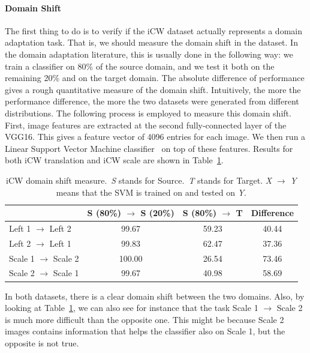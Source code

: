 \documentclass[../main.tex]{subfiles}
\begin{document}
    \paragraph{Domain Shift}
    The first thing to do is to verify if the iCW dataset actually represents a domain adaptation task. That is,
    we should measure the domain shift in the dataset. In the domain adaptation literature, this is usually
    done in the following way: we train a classifier on 80\% of the source domain, and we test it both on the
    remaining 20\% and on the target domain. The absolute difference of performance gives a
    rough quantitative measure of the domain shift. Intuitively, the more the performance difference,
    the more the two datasets were generated from different distributions. The following process is employed
    to measure this domain shift. First, image features are extracted at the second fully-connected layer of the
    VGG16. This gives a feature vector of 4096 entries for each image. We then run a Linear Support Vector Machine
    classifier~\cite{fan2008liblinear} on top of these features. Results for both iCW translation and iCW scale
	are shown in Table~\ref{table:domain-shift}.

	\begin{table}[!ht]
		\centering{}
		\begin{tabular}{l c c c}
			\toprule
                     & S (80\%) $\rightarrow$ S (20\%)  & S (80\%) $\rightarrow$ T & Difference \\
			\midrule
			Left 1 $\rightarrow$ Left 2   & 99.67  & 59.23 & 40.44 \\
			Left 2 $\rightarrow$ Left 1   & 99.83  & 62.47 & 37.36 \\
			Scale 1 $\rightarrow$ Scale 2 & 100.00 & 26.54 & 73.46 \\
			Scale 2 $\rightarrow$ Scale 1 & 99.67  & 40.98 & 58.69 \\

		\end{tabular}
		\caption{iCW domain shift measure.~\textit{S} stands for Source.~\textit{T} stands for Target.
			\textit{X} $\rightarrow$ \textit{Y} means that the SVM is trained on  and tested on \textit{Y}.}\label{table:domain-shift}
	\end{table}

	In both datasets, there is a clear domain shift between the two domains. Also, by looking at Table~\ref{table:domain-shift},
	we can also see for instance that the task Scale 1 $\rightarrow$ Scale 2 is much more difficult than the opposite one. This
	might be because Scale 2 images contains information that helps the classifier also on Scale 1, but the opposite is not true.
\end{document}
